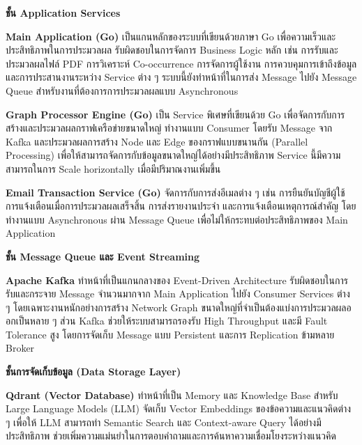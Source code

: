 \documentclass[12pt,a4paper]{article}
\begin{document}
\begin{enumerate}[leftmargin=2cm]
\begin{enumerate}
{            \vspace{3.5cm}

            \textbf{ชั้น Application Services}

            \hspace{1cm}\textbf{Main Application (Go)} เป็นแกนหลักของระบบที่เขียนด้วยภาษา Go เพื่อความเร็วและประสิทธิภาพในการประมวลผล รับผิดชอบในการจัดการ Business Logic หลัก เช่น การรับและประมวลผลไฟล์ PDF การวิเคราะห์ Co-occurrence การจัดการผู้ใช้งาน การควบคุมการเข้าถึงข้อมูล และการประสานงานระหว่าง Service ต่าง ๆ ระบบนี้ยังทำหน้าที่ในการส่ง Message ไปยัง Message Queue สำหรับงานที่ต้องการการประมวลผลแบบ Asynchronous

            \hspace{1cm}\textbf{Graph Processor Engine (Go)} เป็น Service พิเศษที่เขียนด้วย Go เพื่อจัดการกับการสร้างและประมวลผลกราฟเครือข่ายขนาดใหญ่ ทำงานแบบ Consumer โดยรับ Message จาก Kafka และประมวลผลการสร้าง Node และ Edge ของกราฟแบบขนานกัน (Parallel Processing) เพื่อให้สามารถจัดการกับข้อมูลขนาดใหญ่ได้อย่างมีประสิทธิภาพ Service นี้มีความสามารถในการ Scale horizontally เมื่อมีปริมาณงานเพิ่มขึ้น

            \hspace{1cm}\textbf{Email Transaction Service (Go)} จัดการกับการส่งอีเมลต่าง ๆ เช่น การยืนยันบัญชีผู้ใช้ การแจ้งเตือนเมื่อการประมวลผลเสร็จสิ้น การส่งรายงานประจำ และการแจ้งเตือนเหตุการณ์สำคัญ โดยทำงานแบบ Asynchronous ผ่าน Message Queue เพื่อไม่ให้กระทบต่อประสิทธิภาพของ Main Application

            \vspace{0.3cm}

            \textbf{ชั้น Message Queue และ Event Streaming}

            \hspace{1cm}\textbf{Apache Kafka} ทำหน้าที่เป็นแกนกลางของ Event-Driven Architecture รับผิดชอบในการรับและกระจาย Message จำนวนมากจาก Main Application ไปยัง Consumer Services ต่าง ๆ โดยเฉพาะงานหนักอย่างการสร้าง Network Graph ขนาดใหญ่ที่จำเป็นต้องแบ่งการประมวลผลออกเป็นหลาย ๆ ส่วน Kafka ช่วยให้ระบบสามารถรองรับ High Throughput และมี Fault Tolerance สูง โดยการจัดเก็บ Message แบบ Persistent และการ Replication ข้ามหลาย Broker

            \vspace{0.3cm}

            \textbf{ชั้นการจัดเก็บข้อมูล (Data Storage Layer)}

            \hspace{1cm}\textbf{Qdrant (Vector Database)} ทำหน้าที่เป็น Memory และ Knowledge Base สำหรับ Large Language Models (LLM) จัดเก็บ Vector Embeddings ของข้อความและแนวคิดต่าง ๆ เพื่อให้ LLM สามารถทำ Semantic Search และ Context-aware Query ได้อย่างมีประสิทธิภาพ ช่วยเพิ่มความแม่นยำในการตอบคำถามและการค้นหาความเชื่อมโยงระหว่างแนวคิด

}
\end{enumerate}
\end{enumerate}
\end{document}
